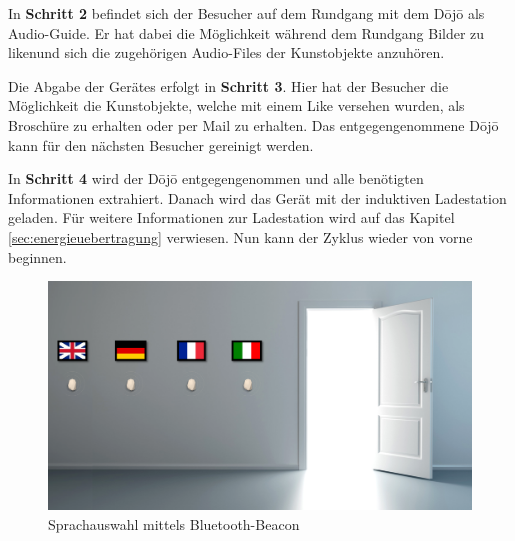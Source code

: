 In \textbf{Schritt 2} befindet sich der Besucher auf dem Rundgang mit dem Dōjō als Audio-Guide. Er hat dabei die Möglichkeit während dem Rundgang Bilder zu \glqq liken\grqq und sich die zugehörigen Audio-Files der Kunstobjekte anzuhören.

Die Abgabe der Gerätes erfolgt in \textbf{Schritt 3}. Hier hat der Besucher die Möglichkeit die Kunstobjekte, welche mit einem {\glqq Like\grqq} versehen wurden, als Broschüre zu erhalten oder per Mail zu erhalten. Das entgegengenommene Dōjō kann für den nächsten Besucher gereinigt werden.

In \textbf{Schritt 4} wird der Dōjō entgegengenommen und alle benötigten Informationen extrahiert. Danach wird das Gerät mit der induktiven Ladestation geladen. Für weitere Informationen zur Ladestation wird auf das Kapitel \ref{sec:energieuebertragung} verwiesen. Nun kann der Zyklus wieder von vorne beginnen.

\begin{figure}[H]
	\begin{center}
		\includegraphics[width=140mm]{data/BeaconSpracherkennung.png}
		\caption[Sprachauswahl mittels Bluetooth-Beacon]{Sprachauswahl mittels Bluetooth-Beacon} %
		\label{fig:SprachauswahlBeacon}
	\end{center}
\end{figure}